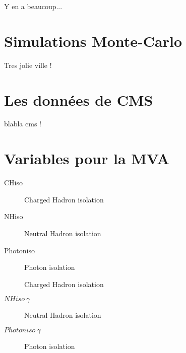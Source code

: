 \label{sec:unchapitre}

Y en a beaucoup...

\section{Simulations Monte-Carlo}

Tres jolie ville !

\section{Les données de CMS}

blabla cms !

\section{Variables pour la MVA}

\begin{description}
	\item [CHiso] Charged Hadron isolation
	\item [NHiso] Neutral Hadron isolation
	\item [Photoniso] Photon isolation
	\item [] Charged Hadron isolation
	\item [$NHiso \: \gamma $] Neutral Hadron isolation
	\item [$Photoniso \: \gamma $] Photon isolation
\end{description}

